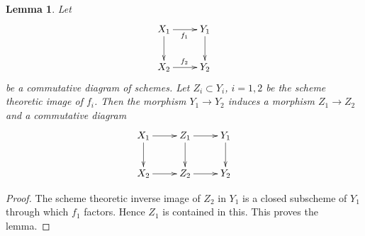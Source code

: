 \documentclass[10pt,a4paper]{amsart}
\theoremstyle{plain}
\newtheorem{lemma}[subsection]{Lemma}
\theoremstyle{definition}
\theoremstyle{remark}
\numberwithin{equation}{subsection}
\begin{document}
\begin{lemma}
\label{lemma-factor-factor}
Let
$$
\xymatrix{
X_1 \ar[d] \ar[r]_{f_1} & Y_1 \ar[d] \\
X_2 \ar[r]^{f_2} & Y_2
}
$$
be a commutative diagram of schemes. Let $Z_i \subset Y_i$, $i = 1, 2$ be
the scheme theoretic image of $f_i$. Then the morphism
$Y_1 \to Y_2$ induces a morphism $Z_1 \to Z_2$ and a
commutative diagram
$$
\xymatrix{
X_1 \ar[r] \ar[d] & Z_1 \ar[d] \ar[r] & Y_1 \ar[d] \\
X_2 \ar[r] & Z_2 \ar[r] & Y_2
}
$$
\end{lemma}

\begin{proof}
The scheme theoretic inverse image of $Z_2$ in $Y_1$
is a closed subscheme of $Y_1$ through
which $f_1$ factors. Hence $Z_1$ is contained in this.
This proves the lemma.
\end{proof}
\end{document}
